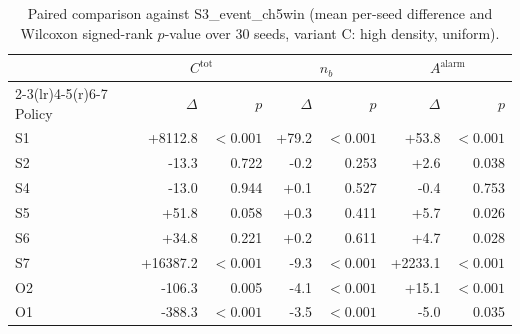 \begin{table}[htbp]
\centering
\caption{Paired comparison against S3_event_ch5win (mean per-seed difference and
Wilcoxon signed-rank $p$-value over 30 seeds, variant C: high density, uniform).}
\label{tab:ch6-paired-C}
\begin{tabular}{@{}lrrrrrr@{}}
\toprule
& \multicolumn{2}{c}{$C^{\mathrm{tot}}$} & \multicolumn{2}{c}{$n_b$}
& \multicolumn{2}{c}{$A^{\mathrm{alarm}}$} \\
\cmidrule(r){2-3}\cmidrule(lr){4-5}\cmidrule(r){6-7}
Policy & $\Delta$ & $p$ & $\Delta$ & $p$ & $\Delta$ & $p$ \\
\midrule

S1 & +8112.8 & $<0.001$ & +79.2 & $<0.001$ & +53.8 & $<0.001$ \\
S2 & -13.3 & 0.722 & -0.2 & 0.253 & +2.6 & 0.038 \\
S4 & -13.0 & 0.944 & +0.1 & 0.527 & -0.4 & 0.753 \\
S5 & +51.8 & 0.058 & +0.3 & 0.411 & +5.7 & 0.026 \\
S6 & +34.8 & 0.221 & +0.2 & 0.611 & +4.7 & 0.028 \\
S7 & +16387.2 & $<0.001$ & -9.3 & $<0.001$ & +2233.1 & $<0.001$ \\
O2 & -106.3 & 0.005 & -4.1 & $<0.001$ & +15.1 & $<0.001$ \\
O1 & -388.3 & $<0.001$ & -3.5 & $<0.001$ & -5.0 & 0.035 \\
\bottomrule
\end{tabular}
\end{table}
